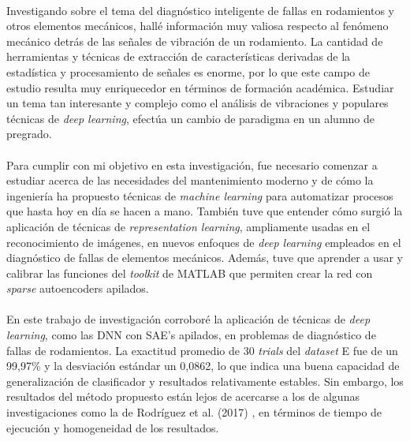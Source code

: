 \documentclass[a4paper,12pt]{article}
\begin{document}
\paragraph{}
Investigando sobre el tema del diagnóstico inteligente de fallas en rodamientos y otros elementos mecánicos, hallé información muy valiosa respecto al fenómeno mecánico detrás de las señales de vibración de un rodamiento. La cantidad de herramientas y técnicas de extracción de características derivadas de la estadística y procesamiento de señales es enorme, por lo que este campo de estudio resulta muy enriquecedor en términos de formación académica. Estudiar un tema tan interesante y complejo como el análisis de vibraciones y populares técnicas de \textit{deep learning}, efectúa un cambio de paradigma en un alumno de pregrado.

\paragraph{}
Para cumplir con mi objetivo en esta investigación, fue necesario comenzar a estudiar acerca de las necesidades del mantenimiento moderno y de cómo la ingeniería ha propuesto técnicas de \textit{machine learning} para automatizar procesos que hasta hoy en día se hacen a mano. También tuve que entender cómo surgió la aplicación de técnicas de \textit{representation learning}, ampliamente usadas en el reconocimiento de imágenes, en nuevos enfoques de \textit{deep learning} empleados en el diagnóstico de fallas de elementos mecánicos. Además, tuve que aprender a usar y calibrar las funciones del \textit{toolkit} de MATLAB que permiten crear la red con \textit{sparse} autoencoders apilados.

\paragraph{}
En este trabajo de investigación corroboré la aplicación de técnicas de \textit{deep learning}, como las DNN con SAE's apilados, en problemas de diagnóstico de fallas de rodamientos. La exactitud promedio de 30 \textit{trials} del \textit{dataset} E fue de un 99,97\% y la desviación estándar un 0,0862, lo que indica una buena capacidad de generalización de clasificador y resultados relativamente estables. Sin embargo, los resultados del método propuesto están lejos de acercarse a los de algunas investigaciones como la de Rodríguez et al. (2017) \cite{nibaldo}, en términos de tiempo de ejecución y homogeneidad de los resultados.
\end{document}
